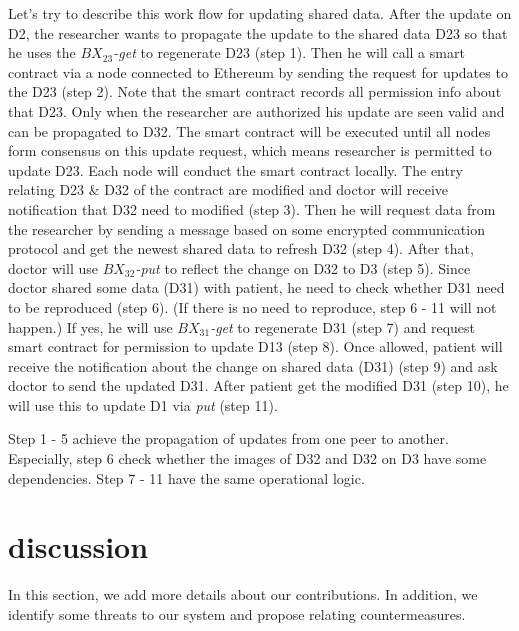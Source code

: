 \documentclass[conference]{IEEEtran}
\begin{document}
Let's try to describe this work flow for updating shared data. After the update on D2, the researcher wants to propagate the update to the shared data D23 so that he uses the \emph{$BX_{23}$-get} to regenerate D23 (step 1). Then he will call a smart contract via a node connected to Ethereum by sending the request for updates to the D23 (step 2). Note that the smart contract records all permission info about that D23. Only when the researcher are authorized his update are seen valid and can be propagated to D32. The smart contract will be executed until all nodes form consensus on this update request, which means researcher is permitted to update D23. Each node will conduct the smart contract locally. The entry relating D23 \& D32 of the contract are modified and doctor will receive notification that D32 need to modified (step 3). Then he will request data from the researcher by sending a message based on some encrypted communication protocol and get the newest shared data to refresh D32 (step 4). After that, doctor will use \emph{$BX_{32}$-put} to reflect the change on D32 to D3 (step 5). Since doctor shared some data (D31) with patient, he need to check whether D31 need to be reproduced (step 6). (If there is no need to reproduce, step 6 - 11 will not happen.) If yes, he will use \emph{$BX_{31}$-get} to regenerate D31 (step 7) and request smart contract for permission to update D13 (step 8). Once allowed, patient will receive the notification about the change on shared data (D31) (step 9) and ask doctor to send the updated D31. After patient get the modified D31 (step 10), he will use this to update D1 via \emph{put} (step 11).  

Step 1 - 5 achieve the propagation of updates from one peer to another. Especially, step 6 check whether the images of D32 and D32 on D3 have some dependencies. Step 7 - 11 have the same operational logic.

%
%
%


\section{discussion}
\label{discuss}
In this section, we add more details about our contributions. In addition, we identify some threats to our system and propose relating countermeasures.
\end{document}
